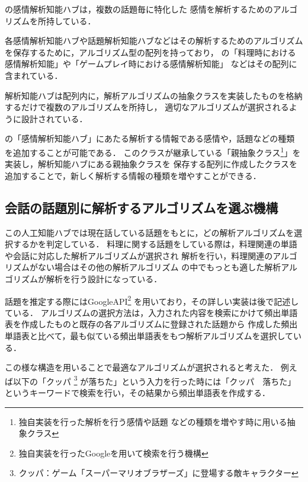 
の感情解析知能ハブは，複数の話題毎に特化した
感情を解析するためのアルゴリズムを所持している．

各感情解析知能ハブや話題解析知能ハブなどはその解析するためのアルゴリズムを保存するために，アルゴリズム型の配列を持っており，
の「料理時における感情解析知能」や「ゲームプレイ時における感情解析知能」
などはその配列に含まれている．

解析知能ハブは配列内に，解析アルゴリズムの抽象クラスを実装したものを格納するだけで複数のアルゴリズムを所持し，
適切なアルゴリズムが選択されるように設計されている．

の「感情解析知能ハブ」にあたる解析する情報である感情や，話題などの種類
を追加することが可能である．
このクラスが継承している「親抽象クラス\footnote{独自実装を行った解析を行う感情や話題
などの種類を増やす時に用いる抽象クラス}」を実装し，解析知能ハブにある親抽象クラスを
保存する配列に作成したクラスを追加することで，新しく解析する情報の種類を増やすことができる．

\subsection{会話の話題別に解析するアルゴリズムを選ぶ機構}
この人工知能ハブでは現在話している話題をもとに，どの解析アルゴリズムを選択するかを判定している．
料理に関する話題をしている際は，料理関連の単語や会話に対応した解析アルゴリズムが選択され
解析を行い，料理関連のアルゴリズムがない場合はその他の解析アルゴリズム
の中でもっとも適した解析アルゴリズムが解析を行う設計になっている．

話題を推定する際にはGoogleAPI\footnote{独自実装を行ったGoogleを用いて検索を行う機構}
を用いており，その詳しい実装は後で記述している．
アルゴリズムの選択方法は，入力された内容を検索にかけて頻出単語表を作成したものと既存の各アルゴリズムに登録された話題から
作成した頻出単語表と比べて，最も似ている頻出単語表をもつ解析アルゴリズムを選択している．

この様な構造を用いることで最適なアルゴリズムが選択されると考えた．
例えば以下の「クッパ
	\footnote{クッパ：ゲーム「スーパーマリオブラザーズ」に登場する敵キャラクター}
が落ちた」という入力を行った時には「クッパ　落ちた」というキーワードで検索を行い，その結果から頻出単語表を作成する．


